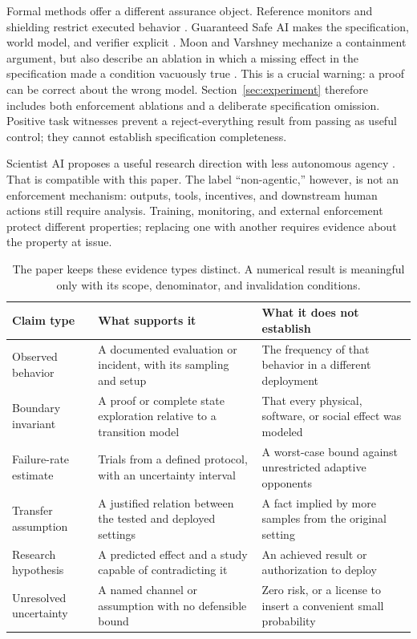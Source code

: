 \documentclass[10pt,twocolumn,letterpaper]{article}
\begin{document}
Formal methods offer a different assurance object. Reference monitors and shielding restrict executed behavior \cite{saltzer,schneider,shield}. Guaranteed Safe AI makes the specification, world model, and verifier explicit \cite{gsai}. Moon and Varshney mechanize a containment argument, but also describe an ablation in which a missing effect in the specification made a condition vacuously true \cite{moon}. This is a crucial warning: a proof can be correct about the wrong model. Section~\ref{sec:experiment} therefore includes both enforcement ablations and a deliberate specification omission. Positive task witnesses prevent a reject-everything result from passing as useful control; they cannot establish specification completeness.

Scientist AI proposes a useful research direction with less autonomous agency \cite{scientist}. That is compatible with this paper. The label ``non-agentic,'' however, is not an enforcement mechanism: outputs, tools, incentives, and downstream human actions still require analysis. Training, monitoring, and external enforcement protect different properties; replacing one with another requires evidence about the property at issue.

\begin{table}[t]
\centering\small
\begin{tabularx}{\textwidth}{@{}P{.18\textwidth}LL@{}}
\toprule
\textbf{Claim type} & \textbf{What supports it} & \textbf{What it does not establish}\\
\midrule
Observed behavior & A documented evaluation or incident, with its sampling and setup & The frequency of that behavior in a different deployment\\
Boundary invariant & A proof or complete state exploration relative to a transition model & That every physical, software, or social effect was modeled\\
Failure-rate estimate & Trials from a defined protocol, with an uncertainty interval & A worst-case bound against unrestricted adaptive opponents\\
Transfer assumption & A justified relation between the tested and deployed settings & A fact implied by more samples from the original setting\\
Research hypothesis & A predicted effect and a study capable of contradicting it & An achieved result or authorization to deploy\\
Unresolved uncertainty & A named channel or assumption with no defensible bound & Zero risk, or a license to insert a convenient small probability\\
\bottomrule
\end{tabularx}
\caption{The paper keeps these evidence types distinct. A numerical result is meaningful only with its scope, denominator, and invalidation conditions.}
\label{tab:claims}
\end{table}
\end{document}
